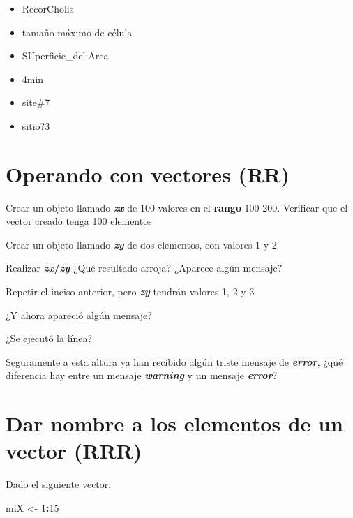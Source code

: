 \documentclass[]{book}
\newenvironment{Shaded}{\begin{snugshade}}{\end{snugshade}}
\newcommand{\DecValTok}[1]{\textcolor[rgb]{0.00,0.00,0.81}{#1}}
\newcommand{\NormalTok}[1]{#1}
\newcommand{\OperatorTok}[1]{\textcolor[rgb]{0.81,0.36,0.00}{\textbf{#1}}}
\newcommand{\StringTok}[1]{\textcolor[rgb]{0.31,0.60,0.02}{#1}}
\providecommand{\tightlist}{%
  \setlength{\itemsep}{0pt}\setlength{\parskip}{0pt}}
\begin{document}
\begin{itemize}
\tightlist
\item
  RecorCholis\\
\item
  tamaño máximo de célula\\
\item
  SUperficie\_del:Area\\
\item
  4min\\
\item
  site\#7
\item
  sitio?3
\end{itemize}

\hypertarget{operando-con-vectores-rr}{%
\section{Operando con vectores (RR)}\label{operando-con-vectores-rr}}

Crear un objeto llamado \textbf{\emph{zx}} de 100 valores en el \textbf{rango} 100-200. Verificar que el vector creado tenga 100 elementos

Crear un objeto llamado \textbf{\emph{zy}} de dos elementos, con valores 1 y 2

Realizar \textbf{\emph{zx}/\emph{zy}} ¿Qué resultado arroja? ¿Aparece algún mensaje?

Repetir el inciso anterior, pero \textbf{\emph{zy}} tendrán valores 1, 2 y 3

¿Y ahora apareció algún mensaje?

¿Se ejecutó la línea?

Seguramente a esta altura ya han recibido algún triste mensaje de \textbf{\emph{error}}, ¿qué diferencia hay entre un mensaje \textbf{\emph{warning}} y un mensaje \textbf{\emph{error}}?

\hypertarget{dar-nombre-a-los-elementos-de-un-vector-rrr}{%
\section{Dar nombre a los elementos de un vector (RRR)}\label{dar-nombre-a-los-elementos-de-un-vector-rrr}}

Dado el siguiente vector:

\begin{Shaded}
\begin{Highlighting}[]
\NormalTok{miX <-}\StringTok{ }\DecValTok{1}\OperatorTok{:}\DecValTok{15}
\end{Highlighting}
\end{Shaded}
\end{document}
